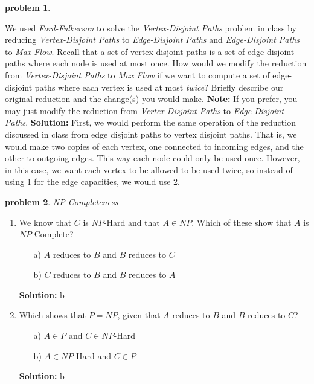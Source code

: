 \documentclass[10pt]{article}
\newcommand{\solution}[1]{\color{blue}\hfill\break\noindent\textbf{Solution:} #1\color{black}}
\newtheorem{problem}{\sc\color{cit}problem}
\begin{document}
 
\begin{problem}\end{problem}
We used \emph{Ford-Fulkerson} to solve the \emph{Vertex-Disjoint Paths} problem in class by reducing
\emph{Vertex-Disjoint Paths} to \emph{Edge-Disjoint Paths} and 
\emph{Edge-Disjoint Paths} to \emph{Max Flow}. Recall that a set of vertex-disjoint paths is
a set of edge-disjoint paths where each node is used at most once. How would we modify the reduction from \emph{Vertex-Disjoint Paths} to \emph{Max Flow} if we want to compute a set of edge-disjoint paths where each vertex is used at most {\em twice}? Briefly describe our original reduction and the change(s) you would make. {\bf Note:} If you prefer, you may just modify the reduction from \emph{Vertex-Disjoint Paths} to \emph{Edge-Disjoint Paths}.
\solution{
    First, we would perform the same operation of the reduction discussed in class from edge disjoint paths to vertex disjoint paths. That is, we would make two copies of each vertex, one connected to incoming edges, and the other to outgoing edges. This way each node could only be used once. However, in this case, we want each vertex to be allowed to be used twice, so instead of using 1 for the edge capacities, we would use 2.
}


\begin{problem}NP Completeness\end{problem}
\begin{enumerate}
    \item We know that $C$ is $NP$-Hard and that $A \in NP$.  Which of these show that $A$ is $NP$-Complete?
    \begin{itemize}
        \item[a)] $A$ reduces to $B$ and $B$ reduces to $C$
        \item[b)] $C$ reduces to $B$ and $B$ reduces to $A$
    \end{itemize}
    \solution{
        b
    }

    
    \item Which shows that $P = NP$, given that $A$ reduces to $B$ and $B$ reduces to $C$?
    \begin{itemize}
        \item[a)] $A \in P$ and $C \in NP$-Hard
        \item[b)] $A \in NP$-Hard and $C \in P$
    \end{itemize}
    \solution{
        b
    }

\end{enumerate}
\end{document}
